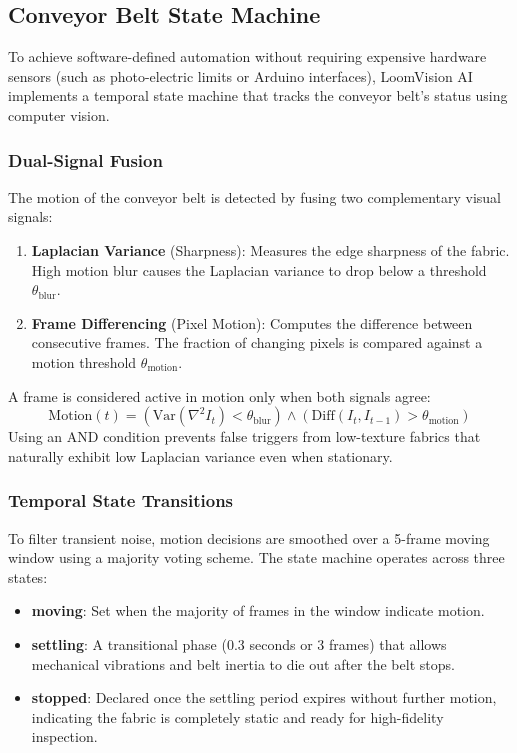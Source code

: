 \documentclass{ieeeaccess}
\begin{document}
\subsection{Conveyor Belt State Machine}
To achieve software-defined automation without requiring expensive hardware sensors (such as photo-electric limits or Arduino interfaces), LoomVision AI implements a temporal state machine that tracks the conveyor belt's status using computer vision.

\subsubsection{Dual-Signal Fusion}
The motion of the conveyor belt is detected by fusing two complementary visual signals:
\begin{enumerate}
    \item \textbf{Laplacian Variance} (Sharpness): Measures the edge sharpness of the fabric. High motion blur causes the Laplacian variance to drop below a threshold $\theta_{\text{blur}}$.
    \item \textbf{Frame Differencing} (Pixel Motion): Computes the difference between consecutive frames. The fraction of changing pixels is compared against a motion threshold $\theta_{\text{motion}}$.
\end{enumerate}
A frame is considered active in motion only when both signals agree:
\begin{equation}
\text{Motion}(t) = (\text{Var}(\nabla^2 I_t) < \theta_{\text{blur}}) \land (\text{Diff}(I_t, I_{t-1}) > \theta_{\text{motion}})
\label{eq:motion_fusion}
\end{equation}
Using an AND condition prevents false triggers from low-texture fabrics that naturally exhibit low Laplacian variance even when stationary.

\subsubsection{Temporal State Transitions}
To filter transient noise, motion decisions are smoothed over a 5-frame moving window using a majority voting scheme. The state machine operates across three states:
\begin{itemize}
    \item \textbf{moving}: Set when the majority of frames in the window indicate motion.
    \item \textbf{settling}: A transitional phase (0.3 seconds or 3 frames) that allows mechanical vibrations and belt inertia to die out after the belt stops.
    \item \textbf{stopped}: Declared once the settling period expires without further motion, indicating the fabric is completely static and ready for high-fidelity inspection.
\end{itemize}
\end{document}
